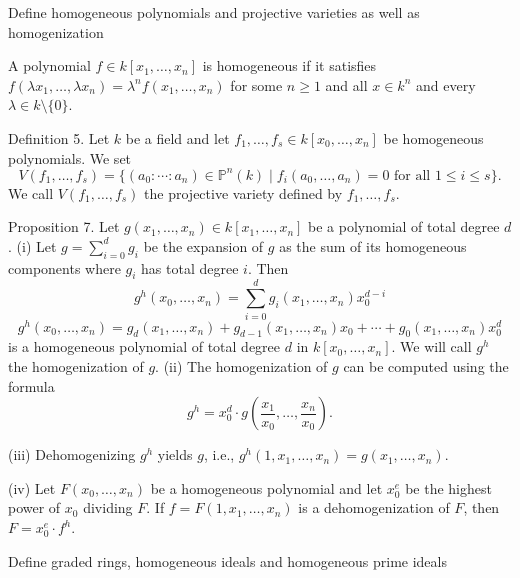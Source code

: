 Define homogeneous polynomials and projective varieties as well as homogenization

A polynomial \( f \in k[x_1, \dots, x_n] \) is homogeneous if it satisfies \( f(\lambda x_1, \dots, \lambda x_n) = \lambda^n f(x_1, \dots, x_n) \)
for some \( n \geq 1 \) and all \( x \in k^n \) and every \( \lambda \in k \setminus \{0\} \).

Definition 5. Let \(k\) be a field and let \(f_1, \ldots, f_s \in k[x_0, \ldots, x_n]\) be homogeneous polynomials. We set
\[
V(f_1, \ldots, f_s) = \{ (a_0 : \cdots : a_n) \in \mathbb{P}^n(k) \mid f_i(a_0, \ldots, a_n) = 0 \text{ for all } 1 \le i \le s \}.
\]
We call \(V(f_1, \ldots, f_s)\) the projective variety defined by \(f_1, \ldots, f_s\).


Proposition 7. Let \(g(x_1, \ldots, x_n) \in k[x_1, \ldots, x_n]\) be a polynomial of total degree \(d\).
(i) Let \(g = \sum_{i=0}^d g_i\) be the expansion of \(g\) as the sum of its homogeneous components where \(g_i\) has total degree \(i\). Then
\[
g^h(x_0, \ldots, x_n) = \sum_{i=0}^d g_i(x_1, \ldots, x_n) x_0^{d-i}
\]
\[
g^h(x_0, \ldots, x_n) = g_d(x_1, \ldots, x_n) + g_{d-1}(x_1, \ldots, x_n)x_0 + \cdots + g_0(x_1, \ldots, x_n)x_0^d
\]
is a homogeneous polynomial of total degree \(d\) in \(k[x_0, \ldots, x_n]\). We will call \(g^h\) the homogenization of \(g\).
(ii) The homogenization of \(g\) can be computed using the formula
\[
g^h = x_0^d \cdot g\left(\frac{x_1}{x_0}, \ldots, \frac{x_n}{x_0}\right).
\]

(iii) Dehomogenizing \(g^h\) yields \(g\), i.e., \(g^h(1, x_1, \ldots, x_n) = g(x_1, \ldots, x_n)\).

(iv) Let \(F(x_0, \ldots, x_n)\) be a homogeneous polynomial and let \(x_0^e\) be the highest power of \(x_0\) dividing \(F\). If \(f = F(1, x_1, \ldots, x_n)\) is a dehomogenization of \(F\), then \(F = x_0^e \cdot f^h\).


Define graded rings, homogeneous ideals and homogeneous prime ideals

